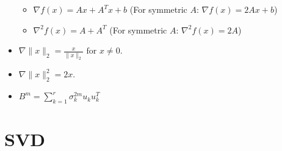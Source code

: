 \documentclass{article}
\begin{document}
\begin{itemize}
\begin{itemize}
    \item $
\nabla f(x) = Ax + A^T x + b
$
(For symmetric \(A\): \(\nabla f(x) = 2Ax + b\))
\item $
\nabla^2 f(x) = A + A^T
$
(For symmetric \(A\): \(\nabla^2 f(x) = 2A\))

\end{itemize}

\item $
\nabla \|x\|_2 = \frac{x}{\|x\|_2} \text{ for } x \neq 0.
$

\item $
\nabla \|x\|^2_2 = 2x.
$

\item $
B^m = \sum_{k=1}^{r} \sigma_k^{2m} u_k u_k^T
$

\end{itemize}



\section{SVD}
\end{document}
